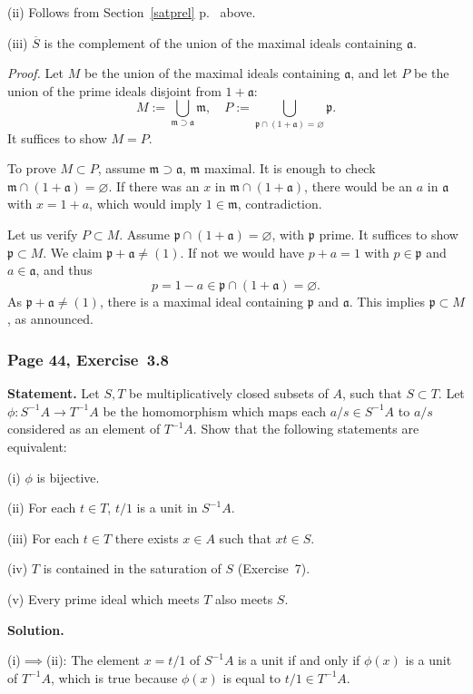 \documentclass[12pt,letterpaper]{article}%
\newcommand{\mf}{\mathfrak}
\newcommand{\aaa}{\mf a}
\newcommand{\mmm}{\mf m}
\newcommand{\ppp}{\mf p}
\newcommand{\nn}{\noindent}
\begin{document}
\nn(ii) Follows from Section~\ref{satprel} p.~\pageref{satprel} above.

\nn(iii) $\overline S$ is the complement of the union of the maximal ideals containing $\aaa$. 

\nn\emph{Proof.} Let $M$ be the union of the maximal ideals containing $\aaa$, and let $P$ be the union of the prime ideals disjoint from $1+\aaa$:
$$
M:=\bigcup_{\mmm\supset\aaa}\mmm,\quad P:=\bigcup_{\ppp\cap(1+\aaa)=\varnothing}\ppp.
$$ 
It suffices to show $M=P$. 

To prove $M\subset P$, assume $\mmm\supset\aaa$, $\mmm$ maximal. It is enough to check $\mmm\cap(1+\aaa)=\varnothing$. If there was an $x$ in $\mmm\cap(1+\aaa)$, there would be an $a$ in $\aaa$ with $x=1+a$, which would imply $1\in\mmm$, contradiction. 

Let us verify $P\subset M$. Assume $\ppp\cap(1+\aaa)=\varnothing$, with $\ppp$ prime. It suffices to show $\ppp\subset M$. We claim $\ppp+\aaa\ne(1)$. If not we would have $p+a=1$ with $p\in\ppp$ and $a\in\aaa$, and thus 
$$
p=1-a\in\ppp\cap(1+\aaa)=\varnothing.
$$ 
As $\ppp+\aaa\ne(1)$, there is a maximal ideal containing $\ppp$ and $\aaa$. This implies $\ppp\subset M$, as announced.

\subsubsection{Page 44, Exercise~3.8}%

\textbf{Statement.} Let $S,T$ be multiplicatively closed subsets of $A$, such that $S\subset T$. Let $\phi:S^{-1}A\to T^{-1}A$ be the homomorphism which maps each $a/s\in S^{-1}A$ to $a/s$ considered as an element of $T^{-1}A$. Show that the following statements are equivalent:

\nn(i) $\phi$ is bijective.

\nn(ii) For each $t\in T$, $t/1$ is a unit in $S^{-1}A$.

\nn(iii) For each $t\in T$ there exists $x\in A$ such that $xt\in S$. 

\nn(iv) $T$ is contained in the saturation of $S$ (Exercise~7).

\nn(v) Every prime ideal which meets $T$ also meets $S$.

\nn\textbf{Solution.}

\nn(i)$\implies$(ii): The element $x=t/1$ of $S^{-1}A$ is a unit if and only if $\phi(x)$ is a unit of $T^{-1}A$, which is true because $\phi(x)$ is equal to $t/1\in T^{-1}A$.
\end{document}
